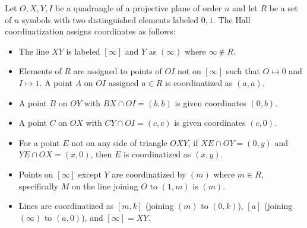 Let $O, X, Y, I$ be a quadrangle of a projective plane of order $n$ and let $R$ be a set of $n$ symbols with two distinguished elements labeled $0, 1$. The Hall coordinatization assigns coordinates as follows:
\begin{itemize}
\item The line $XY$ is labeled $[\infty]$ and $Y$ as $(\infty)$ where $\infty \notin R$.
\item Elements of $R$ are assigned to points of $OI$ not on $[\infty]$ such that $O \mapsto 0$ and $I \mapsto 1$. A point $A$ on $OI$ assigned $a \in R$ is coordinatized as $(a, a)$.
\item A point $B$ on $OY$ with $BX \cap OI = (b, b)$ is given coordinates $(0, b)$.
\item A point $C$ on $OX$ with $CY \cap OI = (c, c)$ is given coordinates $(c, 0)$.
\item For a point $E$ not on any side of triangle $OXY$, if $XE \cap OY = (0, y)$ and $YE \cap OX = (x, 0)$, then $E$ is coordinatized as $(x, y)$.
\item Points on $[\infty]$ except $Y$ are coordinatized by $(m)$ where $m \in R$, specifically $M$ on the line joining $O$ to $(1, m)$ is $(m)$.
\item Lines are coordinatized as $[m, k]$ (joining $(m)$ to $(0, k)$), $[a]$ (joining $(\infty)$ to $(a, 0)$), and $[\infty] = XY$.
\end{itemize}
